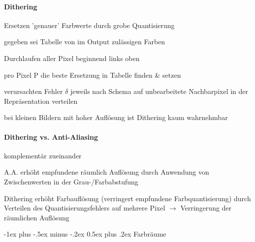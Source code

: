 \documentclass[landscape]{article}
\makeatletter
\renewcommand{\section}{\@startsection{section}{1}{0mm}%
                                {-1ex plus -.5ex minus -.2ex}%
                                {0.5ex plus .2ex}%
                                {\normalfont\large\bfseries}}
\makeatother
\begin{document}
\begin{multicols}{3}
  \paragraph{Dithering}
  \begin{itemize*}
    \item Ersetzen 'genauer' Farbwerte durch grobe Quantisierung
    \item gegeben sei Tabelle von im Output zulässigen Farben
    \item Durchlaufen aller Pixel beginnend links oben
    \item pro Pixel P die beste Ersetzung in Tabelle finden \& setzen
    \item verursachten Fehler $\delta$ jeweils nach Schema auf unbearbeitete Nachbarpixel in der  Repräsentation verteilen
    \item bei kleinen Bildern mit hoher Auflösung ist Dithering kaum wahrnehmbar
  \end{itemize*}

  \paragraph{Dithering vs. Anti-Aliasing}
  \begin{itemize*}
    \item komplementär zueinander
    \item A.A. erhöht empfundene räumlich Auflösung durch Anwendung von Zwischenwerten in der Grau-/Farbabstufung
    \item Dithering erhöht Farbauflösung (verringert empfundene Farbquantisierung) durch Verteilen des Quantisierungsfehlers auf mehrere Pixel $\rightarrow$ Verringerung der räumlichen Auflösung
  \end{itemize*}
  
  \section{Farbräume}

\end{multicols}
\end{document}

